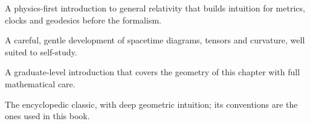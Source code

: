 \begin{furtherreading}
\item[\textcite{Hartle2003}] A physics-first introduction to general relativity
  that builds intuition for metrics, clocks and geodesics before the formalism.
\item[\textcite{Schutz2009}] A careful, gentle development of spacetime
  diagrams, tensors and curvature, well suited to self-study.
\item[\textcite{Carroll2004}] A graduate-level introduction that covers the
  geometry of this chapter with full mathematical care.
\item[\textcite{Misner1973}] The encyclopedic classic, with deep geometric
  intuition; its conventions are the ones used in this book.
\end{furtherreading}

